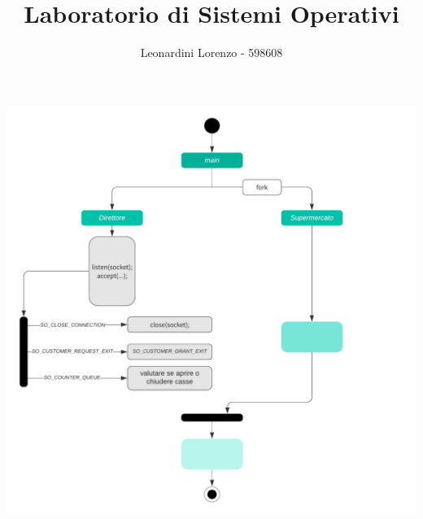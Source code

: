 \documentclass[a4paper,11pt,twoside] {article}
\title{\textbf{Laboratorio di Sistemi Operativi}}
\author{Leonardini Lorenzo - 598608}
\date{}
\begin{document}
\maketitle

\begin{center}
	\includegraphics[width=\textwidth]{chart}
\end{center}
\end{document}
